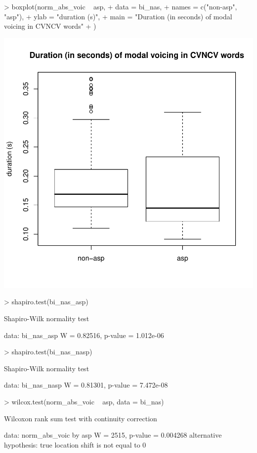 \documentclass[a4paper,11pt]{article}
\begin{document}
\begin{Schunk}
\begin{Sinput}
> boxplot(norm_abs_voic ~ asp,
+         data = bi_nas,
+         names = c("non-asp", "asp"),
+         ylab = "duration (s)",
+         main = "Duration (in seconds) of modal voicing in CVNCV words"
+         )
\end{Sinput}
\end{Schunk}
\includegraphics{analysis-025}

\begin{Schunk}
\begin{Sinput}
> shapiro.test(bi_nas_asp)
\end{Sinput}
\begin{Soutput}
	Shapiro-Wilk normality test

data:  bi_nas_asp
W = 0.82516, p-value = 1.012e-06
\end{Soutput}
\begin{Sinput}
> shapiro.test(bi_nas_nasp)
\end{Sinput}
\begin{Soutput}
	Shapiro-Wilk normality test

data:  bi_nas_nasp
W = 0.81301, p-value = 7.472e-08
\end{Soutput}
\begin{Sinput}
> wilcox.test(norm_abs_voic ~ asp, data = bi_nas)
\end{Sinput}
\begin{Soutput}
	Wilcoxon rank sum test with continuity correction

data:  norm_abs_voic by asp
W = 2515, p-value = 0.004268
alternative hypothesis: true location shift is not equal to 0
\end{Soutput}
\end{Schunk}
\end{document}
